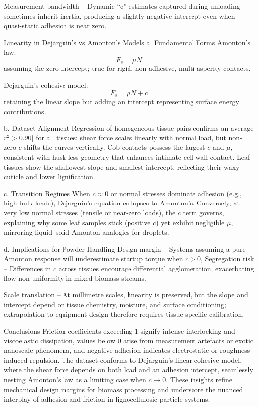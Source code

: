 \documentclass[xcolor=dvipsnames,10pt,hidelinks]{article}
\begin{document}
Measurement bandwidth – Dynamic “c” estimates captured during unloading sometimes inherit inertia, producing a slightly negative intercept even when quasi-static adhesion is near zero.

Linearity in Dejarguin’s vs Amonton’s Models
a. Fundamental Forms
Amonton’s law:
\[F_s = \mu N\]
 assuming the zero intercept; true for rigid, non-adhesive, multi-asperity contacts.

Dejarguin’s cohesive model:
\[F_s = \mu N + c\]
retaining the linear slope but adding an intercept representing surface energy contributions.

b. Dataset Alignment
Regression of homogeneous tissue pairs confirms an average \(r^2 > 0.90]\) for all tissues: shear force scales linearly with normal load, but non-zero \(c\) shifts the curves vertically. Cob contacts possess the largest \(c\) and \(\mu\), consistent with husk-less geometry that enhances intimate cell-wall contact. Leaf tissues show the shallowest slope and smallest intercept, reflecting their waxy cuticle and lower lignification.

c. Transition Regimes
When \(c\approx 0\) or normal stresses dominate adhesion (e.g., high-bulk loads), Dejarguin’s equation collapses to Amonton’s. Conversely, at very low normal stresses (tensile or near-zero loads), the \(c\) term governs, explaining why some leaf samples stick (positive \(c\)) yet exhibit negligible \(\mu\), mirroring liquid–solid Amonton analogies for droplets.

d. Implications for Powder Handling
Design margin – Systems assuming a pure Amonton response will underestimate startup torque when \(c > 0\),
Segregation risk – Differences in \(c\) across tissues encourage differential agglomeration, exacerbating flow non-uniformity in mixed biomass streams.

Scale translation – At millimetre scales, linearity is preserved, but the slope and intercept depend on tissue chemistry, moisture, and surface conditioning; extrapolation to equipment design therefore requires tissue-specific calibration.

Conclusions
Friction coefficients exceeding 1 signify intense interlocking and viscoelastic dissipation, values below 0 arise from measurement artefacts or exotic nanoscale phenomena, and negative adhesion indicates electrostatic or roughness-induced repulsion.
The dataset conforms to Dejarguin’s linear cohesive model, where the shear force depends on both load and an adhesion intercept, seamlessly nesting Amonton’s law as a limiting case when \(c \to 0\).
These insights refine mechanical design margins for biomass processing and underscore the nuanced interplay of adhesion and friction in lignocellulosic particle systems.
\end{document}
